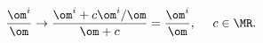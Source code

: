\begin{equation*}
  \frac{\om^i}\om\rightarrow\frac{\om^i+c\om^i/\om}{\om+c}=\frac{\om^i}\om,
  ~~~~c\in\MR.
\end{equation*}

